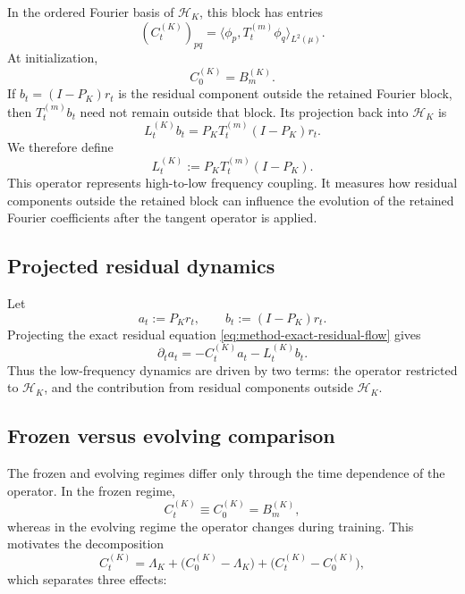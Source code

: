 In the ordered Fourier basis of \(\mathcal H_K\), this block has entries
\begin{equation}
	(C_t^{(K)})_{pq}
	=
	\langle \phi_p,T_t^{(m)}\phi_q\rangle_{L^2(\mu)}.
	\label{eq:method-evolving-block-entry}
\end{equation}
At initialization,
\[
	C_0^{(K)}=B_m^{(K)}.
\]
If \(b_t=(I-P_K)r_t\) is the residual component outside the retained Fourier
block, then \(T_t^{(m)}b_t\) need not remain outside that block. Its projection
back into \(\mathcal H_K\) is
\begin{equation}
	L_t^{(K)}b_t
	=
	P_KT_t^{(m)}(I-P_K)r_t.
\end{equation}
We therefore define
\begin{equation}
	L_t^{(K)}:=P_KT_t^{(m)}(I-P_K).
	\label{eq:method-leakage-operator}
\end{equation}
This operator represents high-to-low frequency coupling. It measures how
residual components outside the retained block can influence the evolution of
the retained Fourier coefficients after the tangent operator is applied.

\subsection{Projected residual dynamics}

Let
\begin{equation}
	a_t:=P_Kr_t,
	\qquad
	b_t:=(I-P_K)r_t.
	\label{eq:method-low-high-residual-split}
\end{equation}
Projecting the exact residual equation \eqref{eq:method-exact-residual-flow} gives
\begin{equation}
	\partial_t a_t
	=
	-C_t^{(K)}a_t
	-
	L_t^{(K)}b_t.
	\label{eq:method-projected-residual-flow}
\end{equation}
Thus the low-frequency dynamics are driven by two terms: the operator restricted
to \(\mathcal H_K\), and the contribution from residual components outside
\(\mathcal H_K\).

\subsection{Frozen versus evolving comparison}

The frozen and evolving regimes differ only through the time dependence of the operator. In
the frozen regime,
\[
	C_t^{(K)}\equiv C_0^{(K)}=B_m^{(K)},
\]
whereas in the evolving regime the operator changes during training. This motivates the
decomposition
\begin{equation}
	C_t^{(K)}
	=
	\Lambda_K
	+
	\bigl(C_0^{(K)}-\Lambda_K\bigr)
	+
	\bigl(C_t^{(K)}-C_0^{(K)}\bigr),
	\label{eq:method-operator-decomposition}
\end{equation}
which separates three effects:

